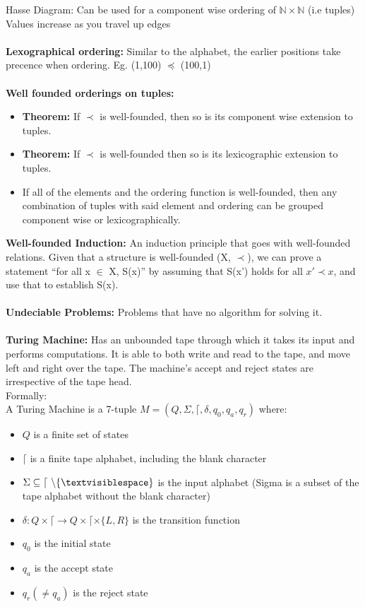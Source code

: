 \documentclass[a4paper,10pt]{article}
\begin{document}
\textcolor{JungleGreen}{Hasse Diagram:} Can be used for a component wise ordering of  $\mathbb{N} \times \mathbb{N}$ (i.e tuples)\\
Values increase as you travel up edges \\\\
\textcolor{JungleGreen}{\textbf{Lexographical ordering:}} Similar to the alphabet, the earlier positions take precence when ordering. Eg. (1,100) $\preceq$ (100,1) \\\\
\textcolor{JungleGreen}{\textbf{Well founded orderings on tuples:}}
\renewcommand{\labelitemi}{\textperiodcentered}
\begin{itemize}
\item \textbf{Theorem:} If $\prec$ is well-founded, then so is its component wise extension to tuples. 
\item \textbf{Theorem:} If $\prec$ is well-founded then so is its lexicographic extension to tuples. 
\item If all of the elements and the ordering function is well-founded, then any combination of tuples with said element and ordering can be grouped component wise or lexicographically. 
\end{itemize}
\textcolor{JungleGreen}{\textbf{Well-founded Induction:}} An induction principle that goes with well-founded relations. Given that a structure is well-founded (X, $\prec$), we can prove a statement ``for all x $\in$ X, S(x)'' by assuming that S(x') holds for all $x' \prec x$, and use that to establish S(x). \\\\
\newpage
\noindent \textcolor{JungleGreen}{\textbf{Undeciable Problems:}} Problems that have no algorithm for solving it. \\\\
\textcolor{JungleGreen}{\textbf{Turing Machine:}} Has an unbounded tape through which it takes its input and performs computations. It is able to both write and read to the tape, and move left and right over the tape. The machine's accept and reject states are irrespective of the tape head. \\
Formally: \\ 
A Turing Machine is a 7-tuple $M = (Q, \Sigma, \lceil, \delta, q_{0}, q_{a}, q_{r})$ where: 
\renewcommand{\labelitemi}{\textperiodcentered}
\begin{itemize}
\item $Q$ is a finite set of states 
\item $\lceil$ is a finite tape alphabet, including the blank character \textvisiblespace
\item $\Sigma \subseteq \lceil \  \backslash \{ \textvisiblespace \}$ is the input alphabet (Sigma is a subset of the tape alphabet without the blank character)
\item $\delta: Q \times \lceil \rightarrow Q \times \lceil \times \{L,R\}$ is the transition function 
\item $q_{0}$ is the initial state 
\item $q_{a}$ is the accept state
\item $q_{r} (\neq q_{a})$ is the reject state
\end{itemize}
\end{document}
